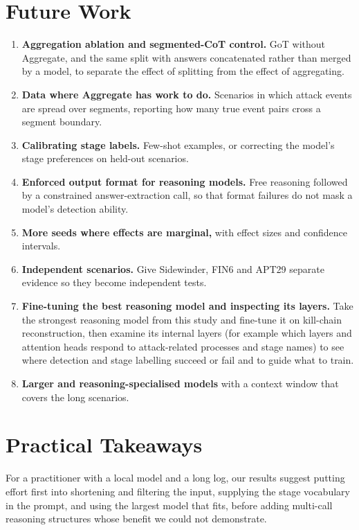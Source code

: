 \section{Future Work}
\begin{enumerate}
\item \textbf{Aggregation ablation and segmented-CoT control.} GoT without Aggregate, and the same split with answers concatenated rather than merged by a model, to separate the effect of splitting from the effect of aggregating.
\item \textbf{Data where Aggregate has work to do.} Scenarios in which attack events are spread over segments, reporting how many true event pairs cross a segment boundary.
\item \textbf{Calibrating stage labels.} Few-shot examples, or correcting the model's stage preferences on held-out scenarios.
\item \textbf{Enforced output format for reasoning models.} Free reasoning followed by a constrained answer-extraction call, so that format failures do not mask a model's detection ability.
\item \textbf{More seeds where effects are marginal,} with effect sizes and confidence intervals.
\item \textbf{Independent scenarios.} Give Sidewinder, FIN6 and APT29 separate evidence so they become independent tests.
\item \textbf{Fine-tuning the best reasoning model and inspecting its layers.} Take the strongest reasoning model from this study and fine-tune it on kill-chain reconstruction, then examine its internal layers (for example which layers and attention heads respond to attack-related processes and stage names) to see where detection and stage labelling succeed or fail and to guide what to train.
\item \textbf{Larger and reasoning-specialised models} with a context window that covers the long scenarios.
\end{enumerate}

\section{Practical Takeaways}
For a practitioner with a local model and a long log, our results suggest putting effort first into shortening and filtering the input, supplying the stage vocabulary in the prompt, and using the largest model that fits, before adding multi-call reasoning structures whose benefit we could not demonstrate.
